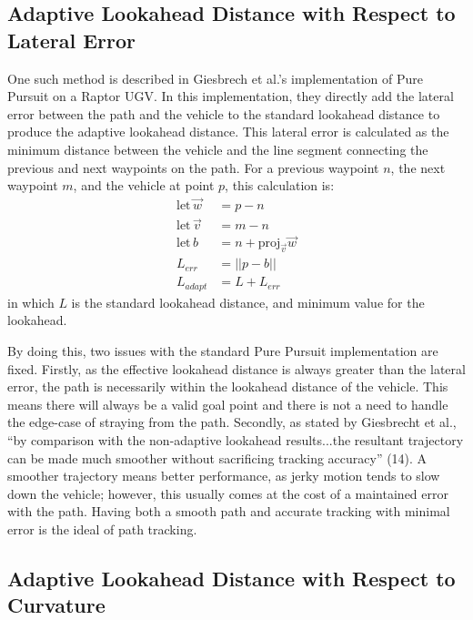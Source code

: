 \documentclass[mla7]{mla}
\begin{document}
\begin{paper}
\subsection{Adaptive Lookahead Distance with Respect to Lateral Error}

One such method is described in Giesbrech et al.'s implementation of Pure Pursuit on a Raptor UGV. In this implementation, they directly add the lateral error between the path and the vehicle to the standard lookahead distance to produce the adaptive lookahead distance. This lateral error is calculated as the minimum distance between the vehicle and the line segment connecting the previous and next waypoints on the path. For a previous waypoint $n$, the next waypoint $m$, and the vehicle at point $p$, this calculation is:
\begin{subequations}
\begin{align}
\text{let}\,\vec{w} &= p - n \\
\text{let}\,\vec{v} &= m - n \\
\text{let}\, b &= n + \text{proj}_{\vec{v}}\vec{w} \label{eqn:nearestPoint}\\
L_{err} &= ||p-b|| \\
L_{adapt} &= L + L_{err}
\end{align}
\end{subequations}
in which $L$ is the standard lookahead distance, and minimum value for the lookahead.

By doing this, two issues with the standard Pure Pursuit implementation are fixed. Firstly, as the effective lookahead distance is always greater than the lateral error, the path is necessarily within the lookahead distance of the vehicle. This means there will always be a valid goal point and there is not a need to handle the edge-case of straying from the path. Secondly, as stated by Giesbrecht et al., ``by comparison with the non-adaptive lookahead results...the resultant trajectory can be made much smoother without sacrificing tracking accuracy'' (14). A smoother trajectory means better performance, as jerky motion tends to slow down the vehicle; however, this usually comes at the cost of a maintained error with the path. Having both a smooth path and accurate tracking with minimal error is the ideal of path tracking.

\subsection{Adaptive Lookahead Distance with Respect to Curvature}


\end{paper}
\end{document}
